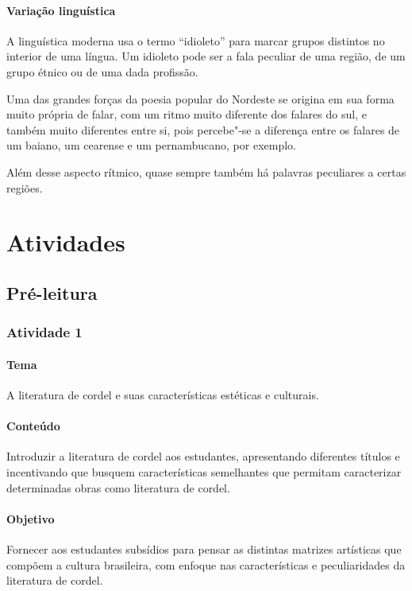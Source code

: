\documentclass[11pt]{extarticle}
\begin{document}
\paragraph{Variação linguística}

A linguística moderna usa o termo “idioleto” para marcar grupos distintos no
interior de uma língua. Um idioleto pode ser a fala peculiar de uma região, de
um grupo étnico ou de uma dada profissão. 

Uma das grandes forças da poesia popular do Nordeste se origina em sua forma
muito própria de falar, com um ritmo muito diferente dos falares do sul, e
também muito diferentes entre si, pois percebe"-se a diferença entre os falares
de um baiano, um cearense e um pernambucano, por exemplo.

Além desse aspecto rítmico, quase sempre também há palavras peculiares a certas
regiões. 


\section{Atividades}

\subsection{Pré-leitura}

\subsubsection{Atividade 1}


\paragraph{Tema} A literatura de cordel e suas características estéticas e culturais.

\paragraph{Conteúdo} Introduzir a literatura de cordel aos estudantes, apresentando diferentes títulos e incentivando que busquem características semelhantes que permitam caracterizar determinadas obras como literatura de cordel.

\paragraph{Objetivo} Fornecer aos estudantes subsídios para pensar as distintas matrizes artísticas que compõem a cultura brasileira, com enfoque nas características e peculiaridades da literatura de cordel.
\end{document}
